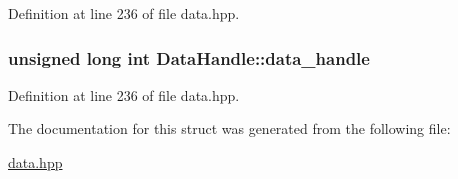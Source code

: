 Definition at line 236 of file data.hpp.\hypertarget{struct_data_handle_a8ef23cf8adc3b32ae4977de4537c673c}{
\subsubsection[{data\_\-handle}]{\setlength{\rightskip}{0pt plus 5cm}unsigned long int {\bf DataHandle::data\_\-handle}}}
\label{struct_data_handle_a8ef23cf8adc3b32ae4977de4537c673c}


Definition at line 236 of file data.hpp.

The documentation for this struct was generated from the following file:\begin{DoxyCompactItemize}
\item 
\hyperlink{data_8hpp}{data.hpp}\end{DoxyCompactItemize}
